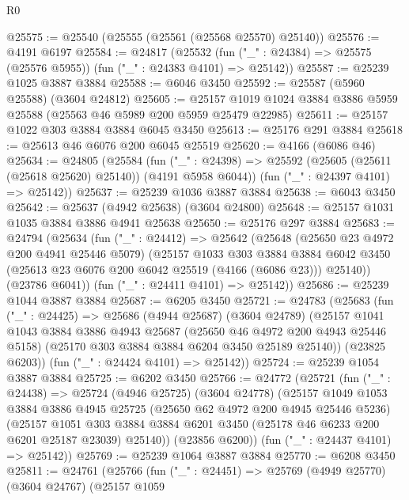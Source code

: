 \begin{lexlean}{R0}
\begin{coremodule}
@25575 := @25540 (@25555 (@25561 (@25568 @25570) @25140))
@25576 := @4191 @6197
@25584 := @24817
    (@25532 (fun ("_" : @24384) => @25575 (@25576 @5955)) (fun ("_" : @24383 @4101) => @25142))
@25587 := @25239 @1025 @3887 @3884
@25588 := @6046 @3450
@25592 := @25587 (@5960 @25588) (@3604 @24812)
@25605 := @25157 @1019 @1024 @3884 @3886 @5959 @25588 (@25563 @46 @5989 @200 @5959 @25479 @22985)
@25611 := @25157 @1022 @303 @3884 @3884 @6045 @3450
@25613 := @25176 @291 @3884
@25618 := @25613 @46 @6076 @200 @6045 @25519
@25620 := @4166 (@6086 @46)
@25634 := @24805
    (@25584
      (fun ("_" : @24398) => @25592 (@25605 (@25611 (@25618 @25620) @25140)) (@4191 @5958 @6044))
      (fun ("_" : @24397 @4101) => @25142))
@25637 := @25239 @1036 @3887 @3884
@25638 := @6043 @3450
@25642 := @25637 (@4942 @25638) (@3604 @24800)
@25648 := @25157 @1031 @1035 @3884 @3886 @4941 @25638
@25650 := @25176 @297 @3884
@25683 := @24794
    (@25634
      (fun ("_" : @24412) =>
      @25642
        (@25648
          (@25650 @23 @4972 @200 @4941 @25446 @5079)
          (@25157
            @1033
            @303
            @3884
            @3884
            @6042
            @3450
            (@25613 @23 @6076 @200 @6042 @25519 (@4166 (@6086 @23)))
            @25140))
        (@23786 @6041))
      (fun ("_" : @24411 @4101) => @25142))
@25686 := @25239 @1044 @3887 @3884
@25687 := @6205 @3450
@25721 := @24783
    (@25683
      (fun ("_" : @24425) =>
      @25686
        (@4944 @25687)
        (@3604 @24789)
        (@25157
          @1041
          @1043
          @3884
          @3886
          @4943
          @25687
          (@25650 @46 @4972 @200 @4943 @25446 @5158)
          (@25170 @303 @3884 @3884 @6204 @3450 @25189 @25140))
        (@23825 @6203))
      (fun ("_" : @24424 @4101) => @25142))
@25724 := @25239 @1054 @3887 @3884
@25725 := @6202 @3450
@25766 := @24772
    (@25721
      (fun ("_" : @24438) =>
      @25724
        (@4946 @25725)
        (@3604 @24778)
        (@25157
          @1049
          @1053
          @3884
          @3886
          @4945
          @25725
          (@25650 @62 @4972 @200 @4945 @25446 @5236)
          (@25157
            @1051
            @303
            @3884
            @3884
            @6201
            @3450
            (@25178 @46 @6233 @200 @6201 @25187 @23039)
            @25140))
        (@23856 @6200))
      (fun ("_" : @24437 @4101) => @25142))
@25769 := @25239 @1064 @3887 @3884
@25770 := @6208 @3450
@25811 := @24761
    (@25766
      (fun ("_" : @24451) =>
      @25769
        (@4949 @25770)
        (@3604 @24767)
        (@25157
          @1059

\end{coremodule}
\end{lexlean}
